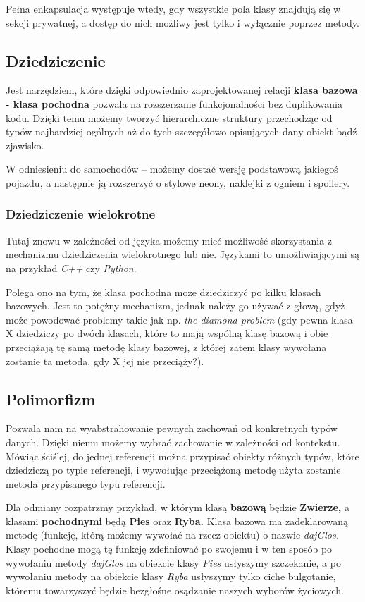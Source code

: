 Pełna enkapsulacja występuje wtedy, gdy wszystkie pola klasy znajdują się w sekcji prywatnej, a dostęp do nich możliwy jest tylko i wyłącznie poprzez metody.

\subsection{Dziedziczenie}
Jest narzędziem, które dzięki odpowiednio zaprojektowanej relacji \textbf{klasa bazowa - klasa pochodna} pozwala na rozszerzanie funkcjonalności bez duplikowania kodu. Dzięki temu możemy tworzyć hierarchiczne struktury przechodząc od typów najbardziej ogólnych aż do tych szczegółowo opisujących dany obiekt bądź zjawisko.

W odniesieniu do samochodów -- możemy dostać wersję podstawową jakiegoś pojazdu, a następnie ją rozszerzyć o stylowe neony, naklejki z ogniem i spoilery.

\subsubsection{Dziedziczenie wielokrotne}
Tutaj znowu w zależności od języka możemy mieć możliwość skorzystania z mechanizmu dziedziczenia wielokrotnego lub nie. Językami to umożliwiającymi są na przykład \textit{C++} czy \textit{Python}. 

Polega ono na tym, że klasa pochodna może dziedziczyć po kilku klasach bazowych. Jest to potężny mechanizm, jednak należy go używać z głową, gdyż może powodować problemy takie jak np. \textit{the diamond problem} (gdy pewna klasa X dziedziczy po dwóch klasach, które to mają wspólną klasę bazową i obie przeciążają tę samą metodę klasy bazowej, z której zatem klasy wywołana zostanie ta metoda, gdy X jej nie przeciąży?).

\subsection{Polimorfizm}
Pozwala nam na wyabstrahowanie pewnych zachowań od konkretnych typów danych. Dzięki niemu możemy wybrać zachowanie w zależności od kontekstu. Mówiąc ściślej, do jednej referencji można przypisać obiekty różnych typów, które dziedziczą po typie referencji, i wywołując przeciążoną metodę użyta zostanie metoda przypisanego typu referencji.

Dla odmiany rozpatrzmy przykład, w którym klasą \textbf{bazową} będzie \textbf{Zwierze,} a klasami \textbf{pochodnymi} będą \textbf{Pies} oraz \textbf{Ryba.} Klasa bazowa ma zadeklarowaną metodę (funkcję, którą możemy wywołać na rzecz obiektu) o nazwie \textit{dajGlos.} Klasy pochodne mogą tę funkcję zdefiniować po swojemu i w ten sposób po wywołaniu metody \textit{dajGlos} na obiekcie klasy \textit{Pies} usłyszymy szczekanie, a po wywołaniu metody na obiekcie klasy \textit{Ryba} usłyszymy tylko ciche bulgotanie, któremu towarzyszyć będzie bezgłośne osądzanie naszych wyborów życiowych.

